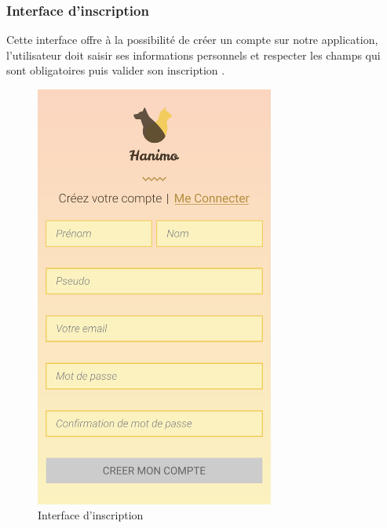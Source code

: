 \documentclass[11pt,a4paper,oneside]{book}
\begin{document}
					\subsubsection{Interface d'inscription}
					Cette interface offre à la possibilité de créer un compte sur notre application, l’utilisateur doit saisir ses informations personnels et respecter les champs qui sont obligatoires puis valider son inscription .
					\begin{figure}[H]
						\centering
						\includegraphics[width=0.7\textwidth]{../Maquettes/Hanimo-maquettes/Output/02-SignUp-Page-empty}
						\caption{Interface d'inscription}
						\label{fig:02-signup-page-empty}
					\end{figure}
\vfill
\end{document}
